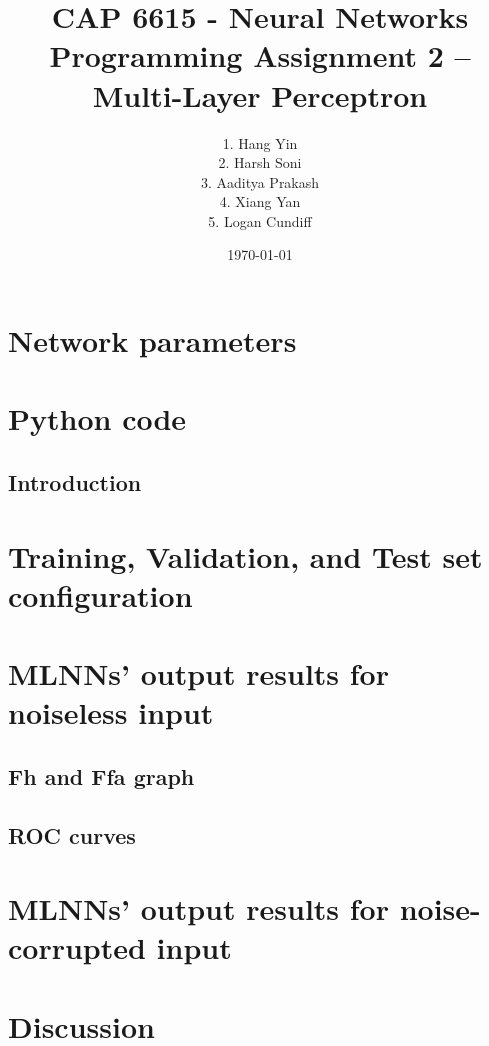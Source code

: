 \documentclass[notitlepage]{article}
\begin{document}
  

\title{CAP 6615 - Neural Networks \\
Programming Assignment 2 -- Multi-Layer Perceptron}

\author{1.   Hang Yin\\
2.   Harsh Soni\\
3.   Aaditya Prakash\\
4.   Xiang Yan\\
5.   Logan Cundiff
}
\date{\isodate\today}

\maketitle

\tableofcontents

\newpage
\section{Network parameters}

 \subsection{}
 

 
\section{Python code}

 \subsection{Introduction}


\section{Training, Validation, and Test set configuration}

\section{MLNNs' output results for noiseless input}

\subsection{Fh and Ffa graph }
\subsection{ROC curves}


\section{MLNNs' output results for noise-corrupted input}

\section{Discussion}
\end{document}
